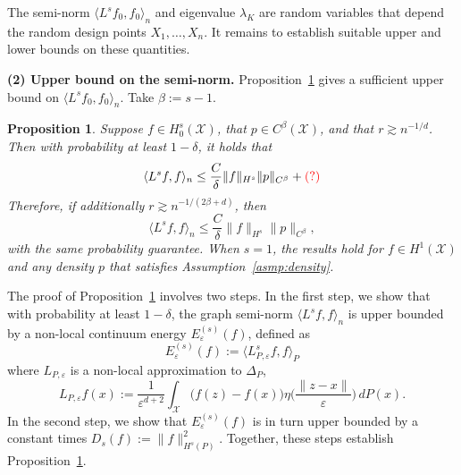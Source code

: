 \documentclass{article}
\newcommand{\1}{\mathbf{1}}
\newcommand{\mc}[1]{\mathcal{#1}}
\newcommand{\dotp}[2]{\langle #1, #2 \rangle}
\theoremstyle{alden}
\theoremstyle{aldenthm}
\newtheorem{proposition}{Proposition}
\theoremstyle{definition}
\theoremstyle{remark}
\begin{document}
The semi-norm $\dotp{L^s f_0}{f_0}_n$ and eigenvalue $\lambda_{K}$ are random variables that depend the random design points $X_1,\ldots,X_n$. It remains to establish suitable upper and lower bounds on these quantities. 

\textbf{(2) Upper bound on the semi-norm. } Proposition~\ref{prop:graph_seminorm} gives a sufficient upper bound on $\dotp{L^s f_0}{f_0}_n$. Take $\beta := s - 1$. 
\begin{proposition}
	\label{prop:graph_seminorm} 
	Suppose $f \in H_0^s(\mc{X})$, that $p \in C^{\beta}(\mc{X})$, and that $r \gtrsim n^{-1/d}$. Then with probability at least $1 - \delta$, it holds that 
	\begin{equation}
	\label{eqn:graph_seminorm_1}
	\dotp{L^s f}{f}_n \leq \frac{C}{\delta} \|f\|_{H^s} \|p\|_{C^{\beta}} + \textcolor{red}{(?)}
	\end{equation}
	Therefore, if additionally $r \gtrsim n^{-1/(2\beta + d)}$, then 
	\begin{equation}
	\label{eqn:graph_seminorm_2}
	\dotp{L^s f}{f}_n \leq \frac{C}{\delta} \|f\|_{H^s} \|p\|_{C^{\beta}},
	\end{equation}
	with the same probability guarantee. When $s = 1$, the results hold for $f \in H^1(\mc{X})$ and any density $p$ that satisfies Assumption~\ref{asmp:density}.
\end{proposition}
The proof of Proposition~\ref{prop:graph_seminorm} involves two steps. In the first step, we show that with probability at least $1 - \delta$, the graph semi-norm $\dotp{L^s f}{f}_n$ is upper bounded by a non-local continuum energy $E_{\varepsilon}^{(s)}(f)$, defined as
\begin{equation*}
E_{\varepsilon}^{(s)}(f) := \dotp{L_{P,\varepsilon}^sf}{f}_{P}
\end{equation*}
where $L_{P,\varepsilon}$ is a non-local approximation to $\Delta_P$, 
\begin{equation}
\label{eqn:nonlocal_laplacian}
L_{P,\varepsilon}f(x) := \frac{1}{\varepsilon^{d + 2}}\int_{\mc{X}}\bigl(f(z) - f(x)\bigr) \eta\biggl(\frac{\|z - x\|}{\varepsilon}\biggr) \,dP(x).
\end{equation}
In the second step, we show that $E_{\varepsilon}^{(s)}(f)$ is in turn upper bounded by a constant times $D_s(f) := \|f\|_{H^s(P)}^2$. Together, these steps establish Proposition~\ref{prop:graph_seminorm}.
\end{document}

